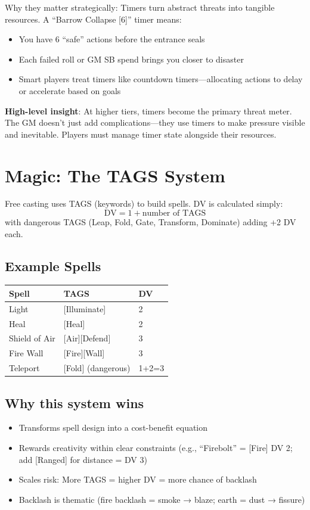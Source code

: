 \documentclass[11pt]{article}
\begin{document}
Why they matter strategically: Timers turn abstract threats into tangible resources. A ``Barrow Collapse [6]'' timer means:
\begin{itemize}
    \item You have 6 ``safe'' actions before the entrance seals
    \item Each failed roll or GM SB spend brings you closer to disaster
    \item Smart players treat timers like countdown timers—allocating actions to delay or accelerate based on goals
\end{itemize}

\textbf{High-level insight}: At higher tiers, timers become the primary threat meter. The GM doesn't just add complications—they use timers to make pressure visible and inevitable. Players must manage timer state alongside their resources.

\section{Magic: The TAGS System}

Free casting uses TAGS (keywords) to build spells. DV is calculated simply:
\[
\text{DV} = 1 + \text{number of TAGS}
\]
with dangerous TAGS (Leap, Fold, Gate, Transform, Dominate) adding +2 DV each.

\subsection{Example Spells}
\begin{table}[h]
\centering
\begin{tabular}{lll}
\toprule
\textbf{Spell} & \textbf{TAGS} & \textbf{DV} \\
\midrule
Light & [Illuminate] & 2 \\
Heal & [Heal] & 2 \\
Shield of Air & [Air][Defend] & 3 \\
Fire Wall & [Fire][Wall] & 3 \\
Teleport & [Fold] (dangerous) & 1+2=3 \\
\bottomrule
\end{tabular}
\end{table}

\subsection{Why this system wins}
\begin{itemize}
    \item Transforms spell design into a cost-benefit equation
    \item Rewards creativity within clear constraints (e.g., ``Firebolt'' = [Fire] DV 2; add [Ranged] for distance = DV 3)
    \item Scales risk: More TAGS = higher DV = more chance of backlash
    \item Backlash is thematic (fire backlash = smoke → blaze; earth = dust → fissure)
\end{itemize}
\end{document}
